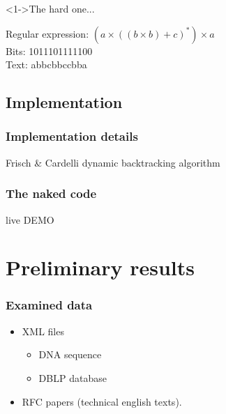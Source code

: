 \documentclass[slidestop,compress,mathserif, xcolor=table]{beamer}
\newenvironment{narrow}[2]{%
  \begin{list}{}{%
  \setlength{\topsep}{0pt}%
  \setlength{\leftmargin}{#1}%
  \setlength{\rightmargin}{#2}%
  \setlength{\listparindent}{\parindent}%
  \setlength{\itemindent}{\parindent}%
  \setlength{\parsep}{\parskip}}%
\item[]}{\end{list}}
\begin{document}
\begin{frame}[c]
\begin{narrow}{-3em}{0in}
  \end{narrow}


  \begin{block}<1->{The hard one...}
    
    Regular expression: $(a \times ((b \times b) + c)^\ast) \times a$ \\
    Bits: 1011101111100\\
    Text: \pause abbcbbccbba
  \end{block}

\end{frame}

\subsection{Implementation}

\begin{frame}
  \frametitle{Implementation details}
  
  Frisch \& Cardelli dynamic backtracking algorithm

\end{frame}

\begin{frame}[c]
  \frametitle{The naked code}

  \begin{center}
    \Huge{live DEMO}
  \end{center}
  
\end{frame}

\section{Preliminary results}

\begin{frame}
  \frametitle{Examined data}
  \begin{itemize}
  \item XML files
    
    \begin{itemize}
    \item DNA sequence
      
    \item DBLP database
    \end{itemize}

  \item RFC papers (technical english texts).
    
  \end{itemize}
\end{frame}
\end{document}
